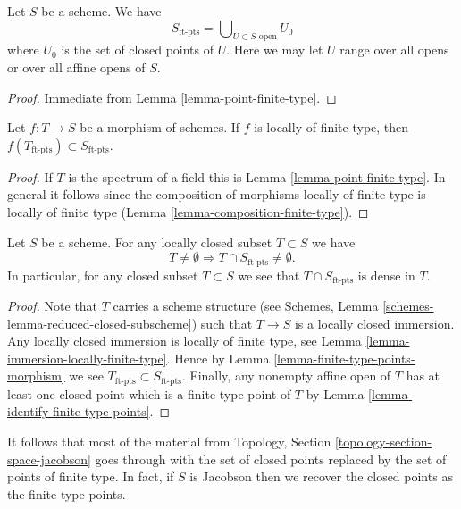 \begin{lemma}
\label{lemma-identify-finite-type-points}
Let $S$ be a scheme. We have
$$
S_{\text{ft-pts}} = \bigcup\nolimits_{U \subset S\text{ open}} U_0
$$
where $U_0$ is the set of closed points of $U$.
Here we may let $U$ range over all opens or over all affine opens of $S$.
\end{lemma}

\begin{proof}
Immediate from Lemma \ref{lemma-point-finite-type}.
\end{proof}

\begin{lemma}
\label{lemma-finite-type-points-morphism}
Let $f : T \to S$ be a morphism of schemes.
If $f$ is locally of finite type, then
$f(T_{\text{ft-pts}}) \subset S_{\text{ft-pts}}$.
\end{lemma}

\begin{proof}
If $T$ is the spectrum of a field this is Lemma \ref{lemma-point-finite-type}.
In general it follows since the composition of morphisms locally of finite
type is locally of finite type (Lemma \ref{lemma-composition-finite-type}).
\end{proof}


\begin{lemma}
\label{lemma-enough-finite-type-points}
Let $S$ be a scheme.
For any locally closed subset $T \subset S$ we have
$$
T \not = \emptyset
\Rightarrow
T \cap S_{\text{ft-pts}} \not = \emptyset.
$$
In particular, for any closed subset $T \subset S$ we
see that $T \cap S_{\text{ft-pts}}$ is dense in $T$.
\end{lemma}

\begin{proof}
Note that $T$ carries a scheme structure (see
Schemes, Lemma \ref{schemes-lemma-reduced-closed-subscheme})
such that $T \to S$ is a locally closed immersion.
Any locally closed immersion is locally of finite type,
see Lemma \ref{lemma-immersion-locally-finite-type}.
Hence by Lemma \ref{lemma-finite-type-points-morphism}
we see $T_{\text{ft-pts}} \subset S_{\text{ft-pts}}$.
Finally, any nonempty affine open of $T$ has at least one closed point
which is a finite type point of $T$ by
Lemma \ref{lemma-identify-finite-type-points}.
\end{proof}

\noindent
It follows that most of the material from
Topology, Section \ref{topology-section-space-jacobson} goes through
with the set of closed points replaced by the set of points of
finite type.
In fact, if $S$ is Jacobson then we recover the closed points as
the finite type points.

